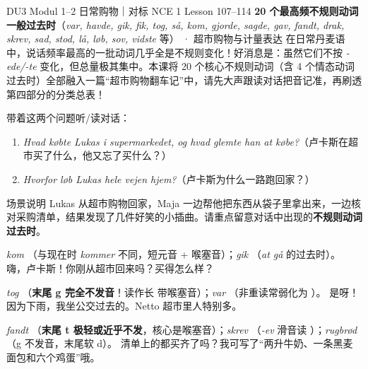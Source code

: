 {DU3 Modul 1--2 日常购物｜对标 NCE 1 Lesson 107--114}
{\textbf{20 个最高频不规则动词一般过去时}（\textit{var, havde, gik, fik, tog, så, kom, gjorde, sagde, gav, fandt, drak, skrev, sad, stod, lå, løb, sov, vidste} 等） · 超市购物与计量表达}
{在日常丹麦语中，说话频率最高的一批动词几乎全是不规则变化！好消息是：虽然它们不按 \textit{-ede/-te} 变化，但总量极其集中。本课将 20 个核心不规则动词（含 4 个情态动词过去时）全部融入一篇“超市购物翻车记”中，请先大声跟读对话把音记准，再刷透第四部分的分类总表！}

\begin{foerduleaeser}
带着这两个问题听/读对话：
\begin{enumerate}
  \item \textit{Hvad købte Lukas i supermarkedet, og hvad glemte han at købe?}（卢卡斯在超市买了什么，他又忘了买什么？）
  \item \textit{Hvorfor løb Lukas hele vejen hjem?}（卢卡斯为什么一路跑回家？）
\end{enumerate}
\end{foerduleaeser}


\begin{tipbox}{场景说明}
Lukas 从超市购物回家，Maja 一边帮他把东西从袋子里拿出来，一边核对采购清单，结果发现了几件好笑的小插曲。请重点留意对话中出现的\textbf{不规则动词过去时}。
\end{tipbox}

{\textit{kom} （与现在时 \textit{kommer} 不同，短元音 + 喉塞音）；\textit{gik} （\textit{at gå} 的过去时）。}
{嗨，卢卡斯！你刚从超市回来吗？买得怎么样？}

{\textit{tog} （\textbf{末尾 g 完全不发音}！读作长  带喉塞音）；\textit{var} （非重读常弱化为 ）。}
{是呀！因为下雨，我坐公交过去的。Netto 超市里人特别多。}

{\textit{fandt} （\textbf{末尾 t 极轻或近乎不发}，核心是喉塞音）；\textit{skrev} （\textit{-ev} 滑音读 ）；\textit{rugbrød} （g 不发音，末尾软 d）。}
{清单上的都买齐了吗？我可写了“两升牛奶、一条黑麦面包和六个鸡蛋”哦。}

